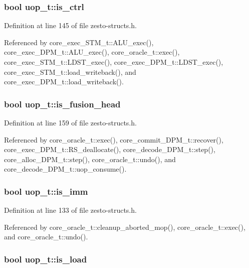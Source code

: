 \subsubsection[{is\_\-ctrl}]{\setlength{\rightskip}{0pt plus 5cm}bool {\bf uop\_\-t::is\_\-ctrl}}\label{structuop__t_9ccd1826a44171c8c8a70f4ba0206bc9}




Definition at line 145 of file zesto-structs.h.

Referenced by core\_\-exec\_\-STM\_\-t::ALU\_\-exec(), core\_\-exec\_\-DPM\_\-t::ALU\_\-exec(), core\_\-oracle\_\-t::exec(), core\_\-exec\_\-STM\_\-t::LDST\_\-exec(), core\_\-exec\_\-DPM\_\-t::LDST\_\-exec(), core\_\-exec\_\-STM\_\-t::load\_\-writeback(), and core\_\-exec\_\-DPM\_\-t::load\_\-writeback().
\subsubsection[{is\_\-fusion\_\-head}]{\setlength{\rightskip}{0pt plus 5cm}bool {\bf uop\_\-t::is\_\-fusion\_\-head}}\label{structuop__t_e915e589eff078d3f108ff4d45ed216c}




Definition at line 159 of file zesto-structs.h.

Referenced by core\_\-oracle\_\-t::exec(), core\_\-commit\_\-DPM\_\-t::recover(), core\_\-exec\_\-DPM\_\-t::RS\_\-deallocate(), core\_\-decode\_\-DPM\_\-t::step(), core\_\-alloc\_\-DPM\_\-t::step(), core\_\-oracle\_\-t::undo(), and core\_\-decode\_\-DPM\_\-t::uop\_\-consume().
\subsubsection[{is\_\-imm}]{\setlength{\rightskip}{0pt plus 5cm}bool {\bf uop\_\-t::is\_\-imm}}\label{structuop__t_b1051f89245a2a2d5ea721ab6b4c9870}




Definition at line 133 of file zesto-structs.h.

Referenced by core\_\-oracle\_\-t::cleanup\_\-aborted\_\-mop(), core\_\-oracle\_\-t::exec(), and core\_\-oracle\_\-t::undo().
\subsubsection[{is\_\-load}]{\setlength{\rightskip}{0pt plus 5cm}bool {\bf uop\_\-t::is\_\-load}}\label{structuop__t_fd9cc07575e4452cb5192588691e6814}




